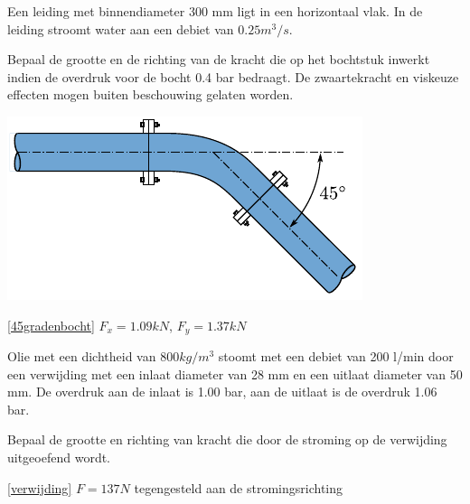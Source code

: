 \begin{toepassing}[*]
	\label{45gradenbocht}
Een leiding met binnendiameter 300 mm ligt in een horizontaal vlak. In de leiding stroomt water aan een debiet van $0.25 \unit{m^3/s}$.

Bepaal de grootte en de richting van de kracht die op het bochtstuk inwerkt indien de overdruk voor de bocht 0.4 bar bedraagt. De zwaartekracht en viskeuze effecten mogen buiten beschouwing gelaten worden.

	\centering
	\includegraphics{fig/behoudsvergelijkingen/45gradenbocht}
\end{toepassing}
\begin{antwoord}{\ref{45gradenbocht}}
	$F_x = 1.09 \unit{kN}$, $F_y = 1.37 \unit{kN}$
\end{antwoord}
\begin{toepassing}[*]
	\label{verwijding}
Olie met een dichtheid van $800 \unit{kg/m^3}$ stoomt met een debiet van 200 l/min door een verwijding met een inlaat diameter van 28 mm en een uitlaat diameter van 50 mm. De overdruk aan de inlaat is 1.00 bar, aan de uitlaat is de overdruk 1.06 bar.

Bepaal de grootte en richting van kracht die door de stroming op de verwijding uitgeoefend wordt.
\end{toepassing}
\begin{antwoord}{\ref{verwijding}}
	$F = 137 \unit{N}$ tegengesteld aan de stromingsrichting
\end{antwoord}
